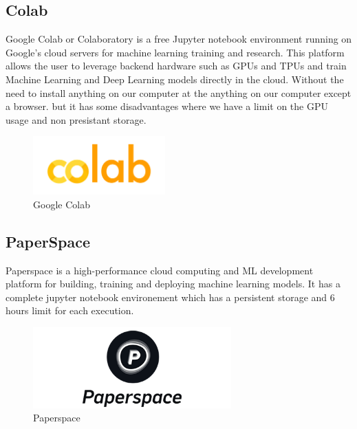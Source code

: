 \subsection{Colab}
\hspace{\parindent}
Google Colab or Colaboratory is a free Jupyter notebook environment running on Google's cloud servers for machine learning training and research. This platform allows the user to leverage backend hardware such as GPUs and TPUs and train Machine Learning and Deep Learning models directly in the cloud. Without the need to install anything on our computer at the anything on our computer except a browser.
but it has some disadvantages where we have a limit on the GPU usage
and non presistant storage.

\begin{figure}[H]
\centering
  \vspace{-0.1in}
    \centerline{\includegraphics[width = 2in]{../images/colab.png}}
    \caption{Google Colab}
    \label{Google Colab}
\end{figure}

\subsection{PaperSpace}
\hspace{\parindent}
Paperspace is a high-performance cloud computing and ML development platform for building, training and deploying machine learning models. It has a complete jupyter notebook environement which has a persistent storage and 6 hours limit for each execution.

\begin{figure}[H]
    \centering
      \vspace{-0.1in}
        \centerline{\includegraphics[width = 3in]{../images/paperspace.png}}
        \caption{Paperspace}
        \label{Paperspace}
    \end{figure}

